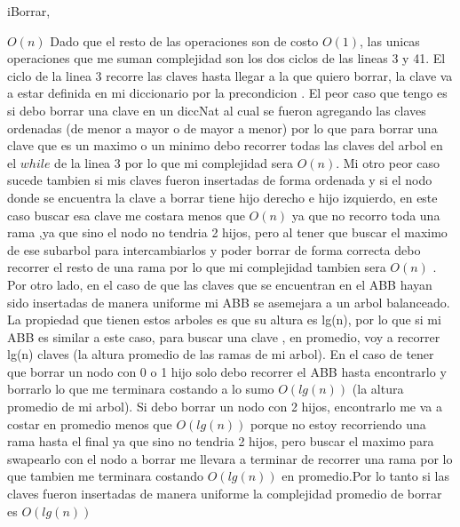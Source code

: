 \begin{Algoritmos}
\begin{algoritmo}{iBorrar}{, }{}
\end{algoritmo}
\datosAlgoritmo{} %
  {} %
  {} %
  {$O(n)$} %
  {Dado que el resto de las operaciones son de costo $O(1)$, las unicas operaciones que me suman complejidad son los dos ciclos de las lineas 3 y 41. El ciclo de la linea 3 recorre las claves hasta llegar a la que quiero borrar, la clave va a estar definida en mi diccionario por la precondicion . El peor caso que tengo es si debo borrar una clave en un diccNat al cual se fueron agregando las claves ordenadas (de menor a mayor o de mayor a menor) por lo que para borrar una clave que es un maximo o un minimo debo recorrer todas las claves del arbol en el $while$ de la linea 3 por lo que mi complejidad sera $O(n)$. Mi otro peor caso sucede tambien si mis claves fueron insertadas de forma ordenada y si el nodo donde se encuentra la clave a borrar tiene hijo derecho e hijo izquierdo, en este caso buscar esa clave me costara menos que $O(n)$ ya que no recorro toda una rama ,ya que sino el nodo no tendria 2 hijos, pero al tener que buscar el maximo de ese subarbol para intercambiarlos y poder borrar de forma correcta debo recorrer el resto de una rama por lo que mi complejidad tambien sera $O(n)$ . \\ Por otro lado, en el caso de que las claves que se encuentran en el ABB hayan sido insertadas de manera uniforme mi ABB se asemejara a un arbol balanceado. La propiedad que tienen estos arboles es que su altura es lg(n), por lo que si mi ABB es similar a este caso, para buscar una clave , en promedio, voy a recorrer lg(n) claves (la altura promedio de las ramas de mi arbol). En el caso de tener que borrar un nodo con 0 o 1 hijo solo debo recorrer el ABB hasta encontrarlo y borrarlo lo que me terminara costando a lo sumo $O(lg(n))$ (la altura promedio de mi arbol). Si debo borrar un nodo con 2 hijos, encontrarlo me va a costar en promedio menos que $O(lg(n))$ porque no estoy recorriendo una rama hasta el final ya que sino no tendria 2 hijos, pero buscar el maximo para swapearlo con el nodo a borrar me llevara a terminar de recorrer una rama por lo que tambien me terminara costando $O(lg(n))$ en promedio.Por lo tanto si las claves fueron insertadas de manera uniforme la complejidad promedio de borrar es $O(lg(n))$} %


\end{Algoritmos}
